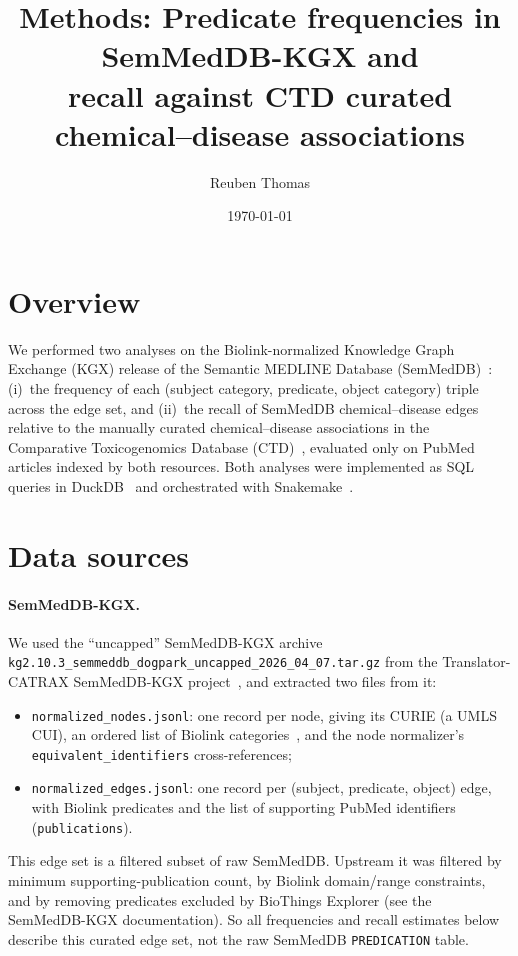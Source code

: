 \documentclass[11pt]{article}
\title{Methods: Predicate frequencies in SemMedDB-KGX and\\
recall against CTD curated chemical--disease associations}
\author{Reuben Thomas}
\date{\today}
\newcommand{\code}[1]{\texttt{#1}}
\begin{document}
\maketitle

\section{Overview}

We performed two analyses on the Biolink-normalized Knowledge Graph Exchange
(KGX) release of the Semantic MEDLINE Database (SemMedDB)~\cite{kilicoglu2012,semmedkgx}:
(i)~the frequency of each (subject category, predicate, object category)
triple across the edge set, and (ii)~the recall of SemMedDB chemical--disease
edges relative to the manually curated chemical--disease associations in the
Comparative Toxicogenomics Database (CTD)~\cite{ctd}, evaluated only on
PubMed articles indexed by both resources. Both analyses were implemented as
SQL queries in DuckDB~\cite{duckdb} and orchestrated with
Snakemake~\cite{snakemake}.

\section{Data sources}

\paragraph{SemMedDB-KGX.}
We used the ``uncapped'' SemMedDB-KGX archive
\code{kg2.10.3\_semmeddb\_dogpark\_uncapped\_2026\_04\_07.tar.gz}
from the Translator-CATRAX SemMedDB-KGX project~\cite{semmedkgx}, and extracted two
files from it:
\begin{itemize}[nosep]
  \item \code{normalized\_nodes.jsonl}: one record per node, giving its CURIE
        (a UMLS CUI), an ordered list of Biolink categories~\cite{biolink},
        and the node normalizer's \code{equivalent\_identifiers}
        cross-references;
  \item \code{normalized\_edges.jsonl}: one record per
        (subject, predicate, object) edge, with Biolink predicates and the list
        of supporting PubMed identifiers (\code{publications}).
\end{itemize}
This edge set is a filtered subset of raw SemMedDB. Upstream it was filtered
by minimum supporting-publication count, by Biolink domain/range constraints,
and by removing predicates excluded by BioThings Explorer (see the
SemMedDB-KGX documentation). So all frequencies and recall estimates below
describe this curated edge set, not the raw SemMedDB \code{PREDICATION}
table.
\end{document}
